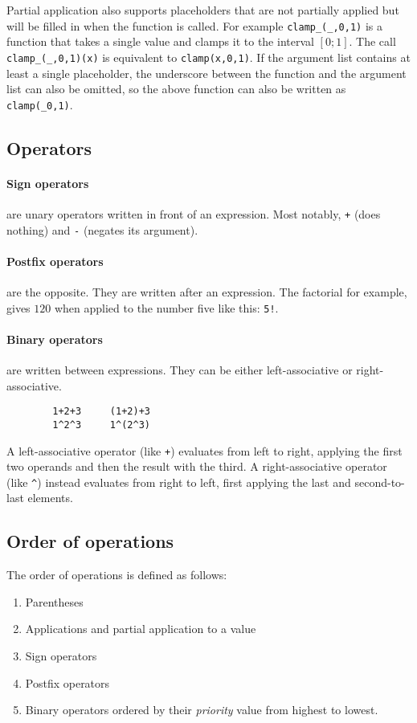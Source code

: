\documentclass[10pt]{article}
\begin{document}
    Partial application also supports placeholders that are not partially applied but will be filled in when the function is called.
    For example \verb|clamp_(_,0,1)| is a function that takes a single value and clamps it to the interval $ [0;1] $.
    The call \verb|clamp_(_,0,1)(x)| is equivalent to \verb|clamp(x,0,1)|.
    If the argument list contains at least a single placeholder, the underscore between the function and the argument list can also be omitted, so the above function can also be written as \verb|clamp(_0,1)|.
    
    \subsection{Operators}\label{subsec:sign-operators}
    \paragraph{Sign operators} are unary operators written in front of an expression.
    Most notably, \verb|+| {\small(does nothing)} and \verb|-| {\small(negates its argument)}.

    \paragraph{Postfix operators} are the opposite.
    They are written after an expression.
    The factorial for example, gives $ 120 $ when applied to the number five like this: \verb|5!|.
    
    \paragraph{Binary operators} are written between expressions.
    They can be either left-associative or right-associative.
    \begin{verbatim}
        1+2+3     (1+2)+3
        1^2^3     1^(2^3)
    \end{verbatim}
    A left-associative operator {\small(like \verb|+|)} evaluates from left to right, applying the first two operands and then the result with the third.
    A right-associative operator {\small(like \verb|^|)} instead evaluates from right to left, first applying the last and second-to-last elements.

    \subsection{Order of operations}\label{subsec:order-of-operations}
    The order of operations is defined as follows:
    \begingroup
    \setlength{\parskip}{0pt}
    \begin{enumerate}
        \item Parentheses
        \item Applications and partial application to a value
        \item Sign operators
        \item Postfix operators
        \item Binary operators ordered by their \textsl{priority} value from highest to lowest.
    \end{enumerate}
    \endgroup
    
\end{document}
